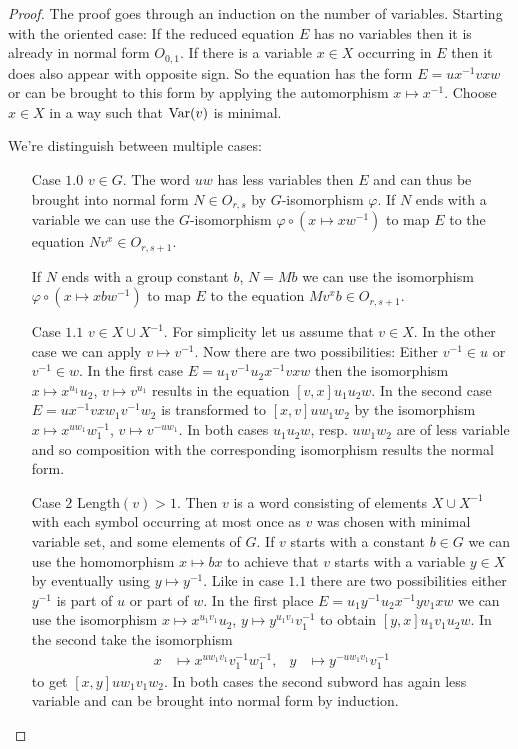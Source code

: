 \documentclass[a4paper,12pt]{article}
\begin{document}
\begin{proof}
The proof goes through an induction on the number of variables. 
 Starting with the oriented case: 
 If the reduced equation $E$ has no variables then it is already in normal form $O_{0,1}$. If there is a variable $x\in X$ occurring in $E$ then it does also appear with opposite sign.
 So the equation has the form $E = ux^{-1}vxw$ or can be brought to this form by applying the automorphism $x \mapsto x^{-1}$. Choose $x\in X$ in a way such that $\textup{Var}(v)$ is minimal. 
 
 We're distinguish between multiple cases: 
 \begin{itemize}
  \item[Case $1.0$] $v\in G$. The word $uw$ has less variables then $E$ and can thus be brought into normal form $N\in O_{r,s}$ by 
  $G$-isomorphism $\varphi$. If $N$ ends with a variable we can use the $G$-isomorphism $\varphi \circ (x\mapsto xw^{-1}) $ to map $E$ to the equation $Nv^x \in O_{r,s+1}$.
    
    If $N$ ends with a group constant $b$, $N=Mb$ we can use the isomorphism $\varphi \circ(x \mapsto xbw^{-1}) $ to map $E$ to the equation $Mv^xb\in O_{r,s+1}$.
   \item[Case $1.1$] $v\in X\cup X^{-1}$. For simplicity let us assume that $v\in X$. In the other case we can apply $v \mapsto v^{-1}$.
    Now there are two possibilities: Either $v^{-1} \in u$ or  $v^{-1} \in w$. In the first case $E= u_1v^{-1}u_2x^{-1}vxw$ then the isomorphism $x \mapsto x^{u_1}u_2$, 
    $v \mapsto v^{u_1}$ results in the equation $[v,x]u_1u_2w$. In the second case $E= ux^{-1}vxw_1v^{-1}w_2$ is transformed to $[x,v]uw_1w_2$ by the isomorphism 
    $x \mapsto x^{uw_1}w_1^{-1}$, $v\mapsto v^{-uw_1}$. In both cases $u_1u_2w$, resp. $uw_1w_2$ are of less variable and so composition with the corresponding isomorphism 
    results the normal form.
   \item[Case $2$] Length$(v)>1$. Then $v$ is a word consisting of elements $X\cup X^{-1}$ with each symbol occurring at most once as $v$ was chosen with minimal variable set, and some elements of $G$. 
   If $v$ starts with a constant $b\in G$ we can use the homomorphism $x\mapsto bx$ to achieve that $v$ starts with a variable $y\in X$ by eventually using $y \mapsto y^{-1}$. Like in case $1.1$ there
   are two possibilities either $y^{-1}$ is part of $u$ or part of $w$. In the first place $E= u_1 y^{-1} u_2 x^{-1}yv_1xw$ we can use the isomorphism $x\mapsto x^{u_1v_1}u_2$, $y\mapsto y^{u_1v_1}v_1^{-1}$
   to obtain $[y,x]u_1v_1u_2w$. In the second take the isomorphism
   \begin{align*}
    x&\mapsto x^{uw_1v_1}v_1^{-1}w_1^{-1}, & y&\mapsto y^{-uw_1v_1}v_1^{-1}
   \end{align*}
   to get $[x,y]uw_1v_1w_2$. In both cases the second subword has again less variable and can be brought into normal form by induction.
    \end{itemize}
 

\end{proof}
\end{document}
